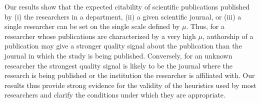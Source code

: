 Our results show that the expected citability of scientific publications published by (i) the researchers in a department, (ii) a given scientific journal, or (iii) a single researcher can be set on the single scale defined by $\mu$. Thus, for a researcher whose publications are characterized by a very high $\mu$, authorship of a publication may give a stronger quality signal about the publication than the journal in which the study is being published. Conversely, for an unknown researcher the strongest quality signal is likely to be the journal where the research is being published or the institution the researcher is affiliated with. Our results thus provide strong evidence for the validity of the heuristics used by most researchers and clarify the conditions under which they are appropriate.
